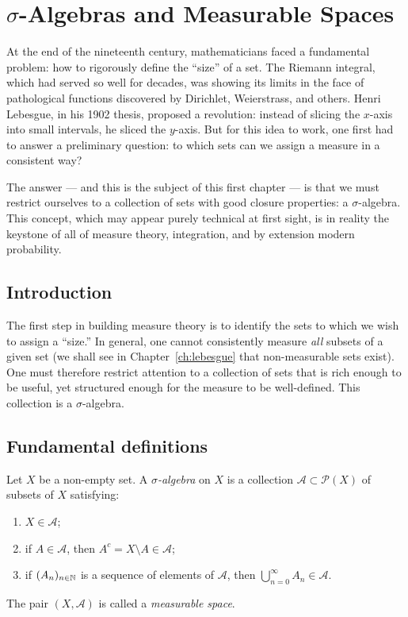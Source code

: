 \chapter{$\sigma$-Algebras and Measurable Spaces}
\label{ch:sigma_algebras}

At the end of the nineteenth century, mathematicians faced a fundamental
problem: how to rigorously define the ``size'' of a set. The Riemann
integral, which had served so well for decades, was showing its limits in
the face of pathological functions discovered by Dirichlet, Weierstrass, and
others. Henri Lebesgue, in his 1902 thesis, proposed a revolution: instead
of slicing the $x$-axis into small intervals, he sliced the $y$-axis. But
for this idea to work, one first had to answer a preliminary question: to
which sets can we assign a measure in a consistent way?

The answer --- and this is the subject of this first chapter --- is that we
must restrict ourselves to a collection of sets with good closure
properties: a $\sigma$-algebra. This concept, which may appear purely
technical at first sight, is in reality the keystone of all of measure
theory, integration, and by extension modern probability.

\section{Introduction}

The first step in building measure theory is to identify the sets to which we wish
to assign a ``size.'' In general, one cannot consistently measure \emph{all} subsets
of a given set (we shall see in Chapter~\ref{ch:lebesgue} that non-measurable sets
exist). One must therefore restrict attention to a collection of sets that is rich
enough to be useful, yet structured enough for the measure to be well-defined. This
collection is a $\sigma$-algebra.

\section{Fundamental definitions}

\begin{definition}
Let $X$ be a non-empty set. A \emph{$\sigma$-algebra} on $X$ is a collection
$\mathcal{A} \subset \mathcal{P}(X)$ of subsets of $X$ satisfying:
\begin{enumerate}
    \item[(i)] $X \in \mathcal{A}$;
    \item[(ii)] if $A \in \mathcal{A}$, then $A^c = X \setminus A \in \mathcal{A}$;
    \item[(iii)] if $(A_n)_{n \in \mathbb{N}}$ is a sequence of elements of $\mathcal{A}$,
    then $\bigcup_{n=0}^{\infty} A_n \in \mathcal{A}$.
\end{enumerate}
The pair $(X, \mathcal{A})$ is called a \emph{measurable space}.
\end{definition}

